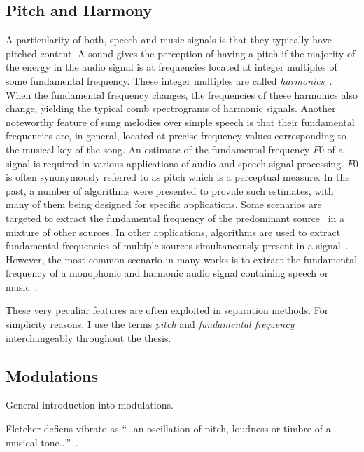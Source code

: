 \subsection{Pitch and Harmony}

A particularity of both, speech and music signals is that they typically have pitched content.
A sound gives the perception of having a pitch if the majority of the energy in the audio signal is at frequencies located at integer multiples of some fundamental frequency.
These integer multiples are called \textit{harmonics}~\cite{schenker54}.
When the fundamental frequency changes, the frequencies of these harmonics also change, yielding the typical comb spectrograms of harmonic signals.
Another noteworthy feature of sung melodies over simple speech is that their fundamental frequencies are, in general, located at precise frequency values corresponding to the musical key of the song.
An estimate of the fundamental frequency $F0$ of a signal is required in various applications of audio and speech signal processing.
$F0$ is often synonymously referred to as pitch which is a perceptual measure. In the past, a number of algorithms were presented to provide such estimates, with many of them being designed for specific applications.
Some scenarios are targeted to extract the fundamental frequency of the predominant source~\cite{salamon12} in a mixture of other sources.
In other applications, algorithms are used to extract fundamental frequencies of multiple sources simultaneously present in a signal~\cite{klapuri2003multiple}.
However, the most common scenario in many works is to extract the fundamental frequency of a monophonic and harmonic audio signal containing speech or music~\cite{talkin1995robust, boersma2002praat, de2002yin, resch, camacho2007swipe, tidhar2010high, christensen2007joint}.

These very peculiar features are often exploited in separation methods.
For simplicity reasons, I use the terms \textit{pitch} and \textit{fundamental frequency} interchangeably throughout the thesis.

\subsection{Modulations}

General introduction into modulations.
\cite{abe98}

Fletcher defiens vibrato as ``...an oscillation of pitch, loudness or timbre of a musical tone...''~\cite{fletcher01}.

